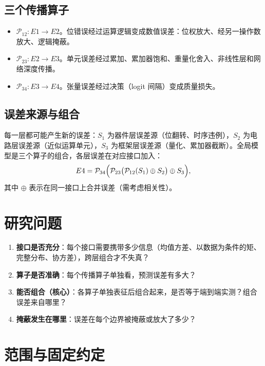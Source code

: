 \documentclass[11pt,a4paper]{ctexart}
\begin{document}
\subsection{三个传播算子}
\begin{itemize}[leftmargin=*]
  \item $\mathcal{P}_{12}: E1 \to E2$。位错误经过运算逻辑变成数值误差：位权放大、经另一操作数放大、逻辑掩蔽。
  \item $\mathcal{P}_{23}: E2 \to E3$。单元误差经过累加、累加器饱和、重量化舍入、非线性层和网络深度传播。
  \item $\mathcal{P}_{34}: E3 \to E4$。张量误差经过决策（logit 间隔）变成质量损失。
\end{itemize}

\subsection{误差来源与组合}
每一层都可能产生新的误差：$S_1$ 为器件层误差源（位翻转、时序违例），$S_2$ 为电路层误差源（近似运算单元），$S_3$ 为框架层误差源（量化、累加器截断）。全局模型是三个算子的组合，各层误差在对应接口加入：
\begin{equation}
E4 = \mathcal{P}_{34}\Bigl(\mathcal{P}_{23}\bigl(\mathcal{P}_{12}(S_1) \oplus S_2\bigr) \oplus S_3\Bigr),
\end{equation}
其中 $\oplus$ 表示在同一接口上合并误差（需考虑相关性）。

\section{研究问题}
\begin{enumerate}[leftmargin=*,label=\textbf{R\arabic*.}]
  \item \textbf{接口是否充分}：每个接口需要携带多少信息（均值方差、以数据为条件的矩、完整分布、协方差），跨层组合才不失真？
  \item \textbf{算子是否准确}：每个传播算子单独看，预测误差有多大？
  \item \textbf{能否组合（核心）}：各算子单独表征后组合起来，是否等于端到端实测？组合误差来自哪里？
  \item \textbf{掩蔽发生在哪里}：误差在每个边界被掩蔽或放大了多少？
\end{enumerate}

\section{范围与固定约定}
\end{document}
